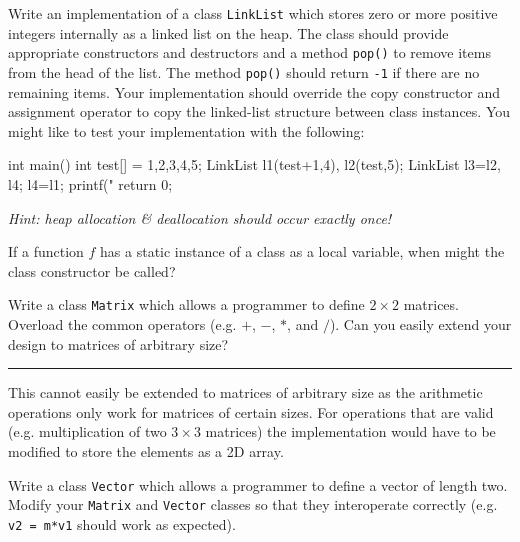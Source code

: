 \documentclass{supervision}
\begin{document}
\begin{questions}
    \question
    Write an implementation of a class \lstinline|LinkList| which stores zero or more positive integers internally as a linked list on the heap. The class should provide appropriate constructors and destructors and a method \lstinline|pop()| to remove items from the head of the list. The method \lstinline|pop()| should return \lstinline|-1| if there are no remaining items. Your implementation should override the copy constructor and assignment operator to copy the linked-list structure between class instances. You might like to test your implementation with the following:

    \begin{cpp}
    int main() {
        int test[] = {1,2,3,4,5};
        LinkList l1(test+1,4), l2(test,5);
        LinkList l3=l2, l4;
        l4=l1;
        printf("%
        return 0;
    }
    \end{cpp}

    \textit{Hint: heap allocation \& deallocation should occur exactly once!}

    \begin{solution}
    \end{solution}

    \question
    If a function $f$ has a static instance of a class as a local variable, when might the class constructor be called?
    \begin{solution}

    \end{solution}

    \question
    Write a class \lstinline|Matrix| which allows a programmer to define $2 \times 2$ matrices. Overload the common operators (e.g. $+$, $-$, $*$, and $/$). Can you easily extend your design to matrices of arbitrary size?
    \begin{solution}
        \noindent\rule{\linewidth}{0.4pt}
        This cannot easily be extended to matrices of arbitrary size as the arithmetic operations only work for matrices of certain sizes. For operations that are valid (e.g. multiplication of two $3 \times 3$ matrices) the implementation would have to be modified to store the elements as a 2D array.
    \end{solution}

    \question
    Write a class \lstinline|Vector| which allows a programmer to define a vector of length two. Modify your \lstinline|Matrix| and \lstinline|Vector| classes so that they interoperate correctly (e.g. \lstinline|v2 = m*v1| should work as expected).
    \begin{solution}
    \end{solution}


\end{questions}
\end{document}
